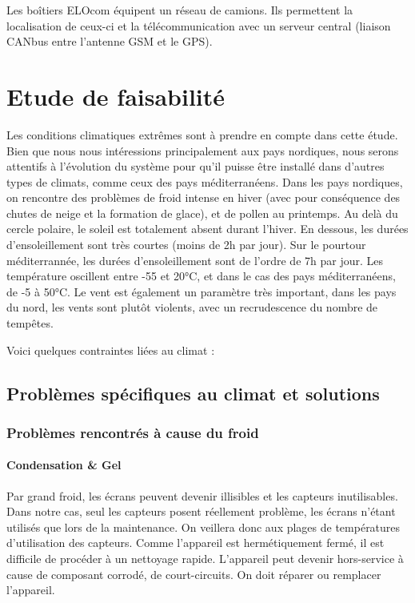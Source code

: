 Les boîtiers ELOcom équipent un réseau de camions. Ils permettent la localisation de ceux-ci et la télécommunication avec un serveur central (liaison CANbus entre l'antenne GSM et le GPS).

\section{Etude de faisabilité}

Les conditions climatiques extrêmes sont à prendre en compte dans cette étude. Bien que nous nous intéressions principalement aux pays nordiques, nous serons attentifs à l'évolution du système pour qu'il puisse être installé dans d'autres types de climats, comme ceux des pays méditerranéens.
Dans les pays nordiques, on rencontre des problèmes de froid intense en hiver (avec pour conséquence des chutes de neige et la formation de glace), et de pollen au printemps. Au delà du cercle polaire, le soleil est totalement absent durant l'hiver. En dessous, les durées d'ensoleillement sont très courtes (moins de 2h par jour). Sur le pourtour méditerrannée, les durées d'ensoleillement sont de l'ordre de 7h par jour.
Les température oscillent entre -55 et 20°C, et dans le cas des pays méditerranéens, de -5 à 50°C.
Le vent est également un paramètre très important, dans les pays du nord, les vents sont plutôt violents, avec un recrudescence du nombre de tempêtes.

Voici quelques contraintes liées au climat :

\subsection{Problèmes spécifiques au climat et solutions}

\subsubsection{Problèmes rencontrés à cause du froid}

\paragraph{Condensation \&  Gel}

Par grand froid, les écrans peuvent devenir illisibles et les capteurs inutilisables. Dans notre cas, seul les capteurs posent réellement problème, les écrans n'étant utilisés que lors de la maintenance. On veillera donc aux plages de températures d'utilisation des capteurs.
Comme l'appareil est hermétiquement fermé, il est difficile de procéder à un nettoyage rapide. L'appareil peut devenir hors-service à cause de composant corrodé, de court-circuits. On doit réparer ou remplacer l'appareil.

